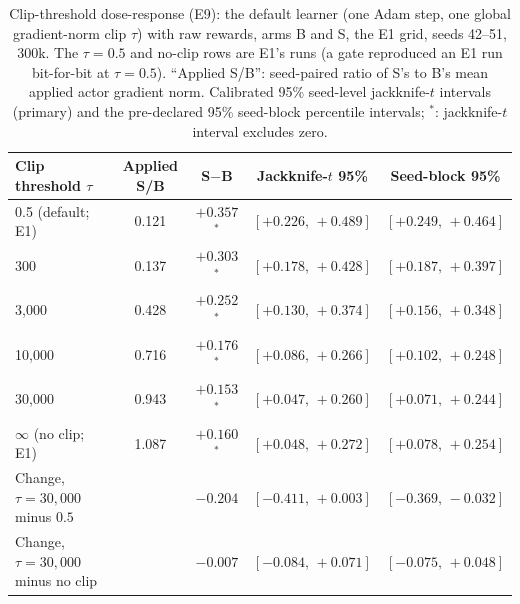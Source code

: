 \begin{table}[!htbp]
\caption{Clip-threshold dose-response (E9): the default learner (one Adam step, one global gradient-norm clip $\tau$) with raw rewards, arms B and S, the E1 grid, seeds 42--51, 300k. The $\tau=0.5$ and no-clip rows are E1's runs (a gate reproduced an E1 run bit-for-bit at $\tau=0.5$). ``Applied S/B'': seed-paired ratio of S's to B's mean applied actor gradient norm. Calibrated 95\% seed-level jackknife-$t$ intervals (primary) and the pre-declared 95\% seed-block percentile intervals; $^{\ast}$: jackknife-$t$ interval excludes zero.}
\label{tab:e9}
\centering\footnotesize
\begin{tabular}{@{}lcccc@{}}
\toprule
Clip threshold $\tau$ & Applied S/B & S$-$B & Jackknife-$t$ 95\% & Seed-block 95\% \\
\midrule
0.5 (default; E1) & 0.121 & $+0.357$$^{\ast}$ & $[+0.226,\,+0.489]$ & $[+0.249,\,+0.464]$ \\
300 & 0.137 & $+0.303$$^{\ast}$ & $[+0.178,\,+0.428]$ & $[+0.187,\,+0.397]$ \\
3,000 & 0.428 & $+0.252$$^{\ast}$ & $[+0.130,\,+0.374]$ & $[+0.156,\,+0.348]$ \\
10,000 & 0.716 & $+0.176$$^{\ast}$ & $[+0.086,\,+0.266]$ & $[+0.102,\,+0.248]$ \\
30,000 & 0.943 & $+0.153$$^{\ast}$ & $[+0.047,\,+0.260]$ & $[+0.071,\,+0.244]$ \\
$\infty$ (no clip; E1) & 1.087 & $+0.160$$^{\ast}$ & $[+0.048,\,+0.272]$ & $[+0.078,\,+0.254]$ \\
Change, $\tau{=}30{,}000$ minus $0.5$ &  & $-0.204$ & $[-0.411,\,+0.003]$ & $[-0.369,\,-0.032]$ \\
Change, $\tau{=}30{,}000$ minus no clip &  & $-0.007$ & $[-0.084,\,+0.071]$ & $[-0.075,\,+0.048]$ \\
\bottomrule
\end{tabular}
\end{table}
